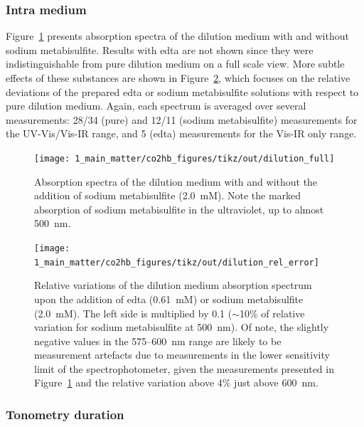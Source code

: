 \subsubsection{Intra medium}

Figure~\ref{fig:co2hb:dilution_full} presents absorption spectra of the dilution medium with and without sodium metabisulfite. Results with \gls{edta} are not shown since they were indistinguishable from pure dilution medium on a full scale view. More subtle effects of these substances are shown in Figure~\ref{fig:co2hb:dilution_err}, which focuses on the relative deviations of the prepared \gls{edta} or sodium metabisulfite solutions with respect to pure dilution medium. Again, each spectrum is averaged over several measurements: 28/34 (pure) and 12/11 (sodium metabisulfite) measurements for the UV-Vis/Vis-IR range, and 5 (\gls{edta}) measurements for the Vis-IR only range.

\begin{figure}
	\centering
	\texttt{[image: 1\_main\_matter/co2hb\_figures/tikz/out/dilution\_full]}
	\caption[Absorption spectra of the dilution medium with and without sodium metabisulfite.]{Absorption spectra of the dilution medium with and without the addition of sodium metabisulfite (2.0~mM). Note the marked absorption of sodium metabisulfite in the ultraviolet, up to almost 500~nm.}
	\label{fig:co2hb:dilution_full}
\end{figure}

\begin{figure}
	\centering
	\texttt{[image: 1\_main\_matter/co2hb\_figures/tikz/out/dilution\_rel\_error]}
	\caption[Relative variations of the dilution medium absorption spectrum with sodium metabisulfite and \gls{edta}.]{Relative variations of the dilution medium absorption spectrum upon the addition of \gls{edta} (0.61~mM) or sodium metabisulfite (2.0~mM). The left side is multiplied by 0.1 ($\sim$10\% of relative variation for sodium metabisulfite at 500~nm). Of note, the slightly negative values in the 575--600~nm range are likely to be measurement artefacts due to measurements in the lower sensitivity limit of the spectrophotometer, given the measurements presented in Figure~\ref{fig:co2hb:dilution_full} and the relative variation above 4\% just above 600~nm.}
	\label{fig:co2hb:dilution_err}
\end{figure}

\subsubsection{Tonometry duration}\label{sect:co2hb:tonodur}

